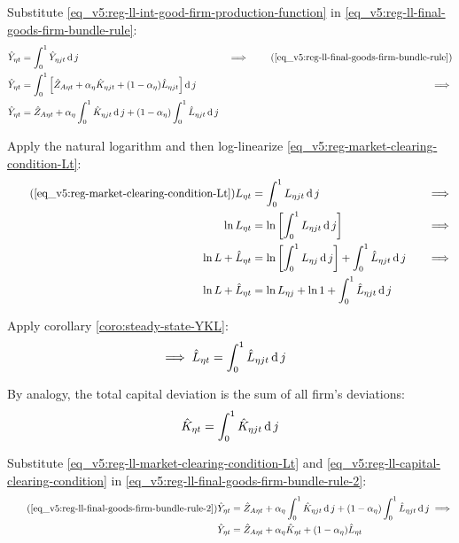 \documentclass[../thesis.tex]{subfiles}
\begin{document}
Substitute \ref{eq_v5:reg-ll-int-good-firm-production-function} in \ref{eq_v5:reg-ll-final-goods-firm-bundle-rule}:
\begin{alignat}{2}
	\hat{Y}_{\eta t} &= \int_{0}^{1} \hat{Y}_{\eta jt} \dif j &\implies \tag{\ref{eq_v5:reg-ll-final-goods-firm-bundle-rule}} \\
	\hat{Y}_{\eta t} &= \int_{0}^{1} \left[ \hat{Z}_{A\eta t} + {\alpha_{\eta}} \hat{K}_{\eta jt} + (1-\alpha_{\eta}) \hat{L}_{\eta jt} \right] \dif j &\implies \nonumber \\
	\hat{Y}_{\eta t} &= \hat{Z}_{A\eta t} + {\alpha_{\eta}} \int_{0}^{1} \hat{K}_{\eta jt} \dif j + (1-\alpha_{\eta}) \int_{0}^{1} \hat{L}_{\eta jt} \dif j \label{eq_v5:reg-ll-final-goods-firm-bundle-rule-2}
\end{alignat}

Apply the natural logarithm and then log-linearize \ref{eq_v5:reg-market-clearing-condition-Lt}:
\begin{alignat}{2}
	\tag{\ref{eq_v5:reg-market-clearing-condition-Lt}}
	L_{\eta t} &= \int_{0}^{1} L_{\eta jt} \dif j &\implies \\
	\ln L_{\eta t} &= \ln \left[ \int_{0}^{1} L_{\eta jt} \dif j \right] &\implies \nonumber \\
	\ln L + \hat{L}_{\eta t} &= \ln \left[ \int_{0}^{1} L_{\eta j} \dif j \right] + \int_{0}^{1} \hat{L}_{\eta jt} \dif j \quad &\implies \nonumber \\
	\ln L + \hat{L}_{\eta t} &= \ln L_{\eta j} + \ln 1 + \int_{0}^{1} \hat{L}_{\eta jt} \dif j \nonumber
\end{alignat}

Apply corollary \ref{coro:steady-state-YKL}:
\begin{align}
	\implies \hat{L}_{\eta t} &= \int_{0}^{1} \hat{L}_{\eta jt} \operatorname{d} j \label{eq_v5:reg-ll-market-clearing-condition-Lt}
\end{align}

By analogy, the total capital deviation is the sum of all firm's deviations:
\begin{align}
	\hat{K}_{\eta t} = \int_{0}^{1} \hat{K}_{\eta jt} \operatorname{d} j \label{eq_v5:reg-ll-capital-clearing-condition}
\end{align}

Substitute \ref{eq_v5:reg-ll-market-clearing-condition-Lt} and \ref{eq_v5:reg-ll-capital-clearing-condition} in \ref{eq_v5:reg-ll-final-goods-firm-bundle-rule-2}:
\begin{align}
	\tag{\ref{eq_v5:reg-ll-final-goods-firm-bundle-rule-2}}
	\hat{Y}_{\eta t} &= \hat{Z}_{A\eta t} + {\alpha_{\eta}} \int_{0}^{1} \hat{K}_{\eta jt} \dif j + (1-\alpha_{\eta}) \int_{0}^{1} \hat{L}_{\eta jt} \dif j \implies \\
	\hat{Y}_{\eta t} &= \hat{Z}_{A\eta t} + {\alpha_{\eta}} \hat{K}_{\eta t} + (1-\alpha_{\eta}) \hat{L}_{\eta t} \label{eq_v5:reg-ll-final-goods-firm-bundle-rule-3}
\end{align}
\end{document}

